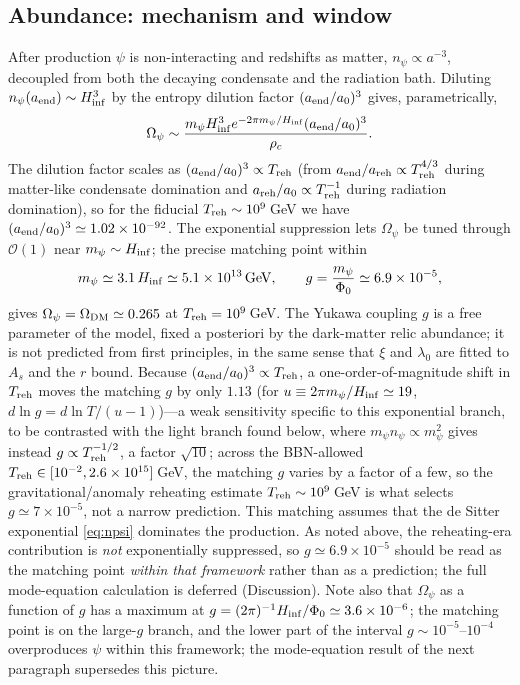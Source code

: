 \documentclass[pdflatex,sn-mathphys-num]{sn-jnl}
\newcommand{\PhiV}{\Phi_0}
\theoremstyle{thmstyleone}
\begin{document}
\subsection{Abundance: mechanism and window}

After production $\psi$ is non-interacting and redshifts as matter, $n_\psi\propto a^{-3}$, decoupled from both the decaying condensate and the radiation bath. Diluting $n_\psi(a_{\rm end})\sim H_{\rm inf}^3$ by the entropy dilution factor $(a_{\rm end}/a_0)^3$ gives, parametrically,
\begin{equation}
\Omega_\psi\sim\frac{m_\psi H_{\rm inf}^3 e^{-2\pi m_\psi/H_{\rm inf}}(a_{\rm end}/a_0)^3}{\rho_c}.
\label{eq:Omegapsi}
\end{equation}
The dilution factor scales as $(a_{\rm end}/a_0)^3\propto T_{\rm reh}$ (from $a_{\rm end}/a_{\rm reh}\propto T_{\rm reh}^{4/3}$ during matter-like condensate domination and $a_{\rm reh}/a_0\propto T_{\rm reh}^{-1}$ during radiation domination), so for the fiducial $T_{\rm reh}\sim10^9\,$GeV we have $(a_{\rm end}/a_0)^3\simeq1.02\times10^{-92}$. The exponential suppression lets $\Omega_\psi$ be tuned through $\mathcal{O}(1)$ near $m_\psi\sim H_{\rm inf}$; the precise matching point within
\begin{equation}
m_\psi\simeq3.1\,H_{\rm inf}\simeq5.1\times10^{13}\,{\rm GeV},
\qquad
g=\frac{m_\psi}{\PhiV}\simeq6.9\times10^{-5},
\label{eq:gwindow}
\end{equation}
gives $\Omega_\psi=\Omega_{\rm DM}\simeq0.265$ at $T_{\rm reh}=10^9\,$GeV. The Yukawa coupling $g$ is a free parameter of the model, fixed a posteriori by the dark-matter relic abundance; it is not predicted from first principles, in the same sense that $\xi$ and $\lambda_0$ are fitted to $A_s$ and the $r$ bound. Because $(a_{\rm end}/a_0)^3\propto T_{\rm reh}$, a one-order-of-magnitude shift in $T_{\rm reh}$ moves the matching $g$ by only $1.13$ (for $u\equiv2\pi m_\psi/H_{\rm inf}\simeq19$, $d\ln g=d\ln T/(u-1)$)---a weak sensitivity specific to this exponential branch, to be contrasted with the light branch found below, where $m_\psi n_\psi\propto m_\psi^{2}$ gives instead $g\propto T_{\rm reh}^{-1/2}$, a factor $\sqrt{10}$; across the BBN-allowed $T_{\rm reh}\in[10^{-2},2.6\times10^{15}]\,$GeV, the matching $g$ varies by a factor of a few, so the gravitational/anomaly reheating estimate $T_{\rm reh}\sim10^9\,$GeV is what selects $g\simeq7\times10^{-5}$, not a narrow prediction. This matching assumes that the de Sitter exponential \eqref{eq:npsi} dominates the production. As noted above, the reheating-era contribution is \emph{not} exponentially suppressed, so $g\simeq6.9\times10^{-5}$ should be read as the matching point \emph{within that framework} rather than as a prediction; the full mode-equation calculation is deferred (Discussion). Note also that $\Omega_\psi$ as a function of $g$ has a maximum at $g=(2\pi)^{-1}H_{\rm inf}/\PhiV\simeq3.6\times10^{-6}$; the matching point is on the large-$g$ branch, and the lower part of the interval $g\sim10^{-5}$--$10^{-4}$ overproduces $\psi$ within this framework; the mode-equation result of the next paragraph supersedes this picture.
\end{document}
